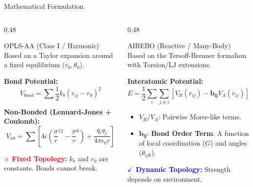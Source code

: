 \documentclass[aspectratio=169, 10pt]{beamer}
\begin{document}
\begin{frame}{Mathematical Formulation}
    \begin{columns}[T]
        
        \begin{column}{0.48\textwidth}
            \begin{block}{OPLS-AA (Class I / Harmonic)}
                Based on a Taylor expansion around a fixed equilibrium ($r_0, \theta_0$).
                
                \vspace{0.5em}
                \footnotesize
                \textbf{Bond Potential:}
                $$ V_{bond} = \sum \frac{1}{2} k_b (r_{ij} - r_0)^2 $$
                
                \textbf{Non-Bonded (Lennard-Jones + Coulomb):}
                $$ V_{nb} = \sum \left[ 4\epsilon \left( \frac{\sigma}{r}^{12} - \frac{\sigma}{r}^6 \right) + \frac{q_i q_j}{4\pi\epsilon_0 r} \right] $$
            \end{block}
            \vspace{0.5em}
            \textcolor{red}{\textbf{$\times$ Fixed Topology:}} $k_b$ and $r_0$ are constants. Bonds cannot break.
        \end{column}
        
        \begin{column}{0.48\textwidth}
            \begin{block}{AIREBO (Reactive / Many-Body)}
                Based on the Tersoff-Brenner formalism with Torsion/LJ extensions.
                
                \vspace{0.5em}
                \footnotesize
                \textbf{Interatomic Potential:}
                $$ E = \frac{1}{2} \sum_{i} \sum_{j \neq i} [V_R(r_{ij}) - \bm{b_{ij}} V_A(r_{ij})] $$
                
                \begin{itemize}
                    \item $V_R/V_A$: Pairwise Morse-like terms.
                    \item $\bm{b_{ij}}$: \textbf{Bond Order Term}. A function of local coordination ($G$) and angles ($\theta_{ijk}$).
                \end{itemize}
            \end{block}
            \vspace{0.5em}
            \textcolor{blue}{\textbf{$\checkmark$ Dynamic Topology:}} Strength depends on environment.
        \end{column}
        
    \end{columns}
\end{frame}
\end{document}
